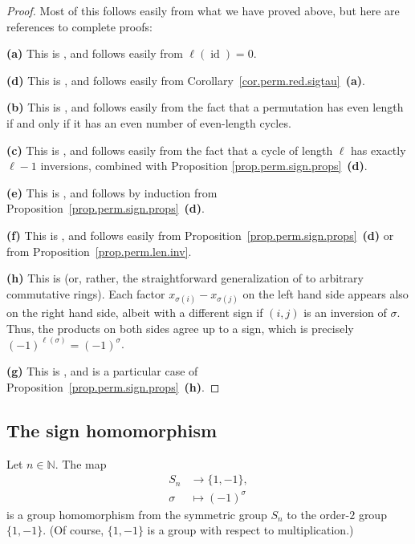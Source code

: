 \begin{proof}
Most of this follows easily from what we have proved above, but here are references to
complete proofs:

\textbf{(a)} This is \cite[Proposition 5.15 \textbf{(a)}]{detnotes}, and
follows easily from $\ell(\operatorname{id}) = 0$.

\textbf{(d)} This is \cite[Proposition 5.15 \textbf{(c)}]{detnotes}, and
follows easily from Corollary~\ref{cor.perm.red.sigtau}~\textbf{(a)}.

\textbf{(b)} This is \cite[Exercise 5.10 \textbf{(b)}]{detnotes}, and follows
easily from the fact that a permutation has even length if and only if
it has an even number of even-length cycles.

\textbf{(c)} This is \cite[Exercise 5.17 \textbf{(d)}]{detnotes}, and follows
easily from the fact that a cycle of length $\ell$ has exactly $\ell - 1$
inversions, combined with Proposition
\ref{prop.perm.sign.props}~\textbf{(d)}.

\textbf{(e)} This is \cite[Proposition 5.28]{detnotes}, and follows by
induction from Proposition~\ref{prop.perm.sign.props}~\textbf{(d)}.

\textbf{(f)} This is \cite[Proposition 5.15 \textbf{(d)}]{detnotes}, and
follows easily from Proposition~\ref{prop.perm.sign.props}~\textbf{(d)} or
from Proposition~\ref{prop.perm.len.inv}.

\textbf{(h)} This is \cite[Exercise 5.13 \textbf{(a)}]{detnotes} (or, rather,
the straightforward generalization of \cite[Exercise 5.13 \textbf{(a)}]{detnotes}
to arbitrary commutative rings). Each
factor $x_{\sigma(i)} - x_{\sigma(j)}$ on the left
hand side appears also on the right hand side, albeit with a different sign if
$(i,j)$ is an inversion of $\sigma$. Thus, the products on both
sides agree up to a sign, which is precisely $(-1)^{\ell(\sigma)} = (-1)^{\sigma}$.

\textbf{(g)} This is \cite[Exercise 5.13 \textbf{(c)}]{detnotes}, and is a
particular case of Proposition~\ref{prop.perm.sign.props}~\textbf{(h)}.
\end{proof}

\subsection{The sign homomorphism}

\begin{corollary}
\label{cor.perm.sign.hom}
\leantarget
\leanok
Let $n \in \mathbb{N}$. The map
\begin{align*}
S_n &\to \{1, -1\}, \\
\sigma &\mapsto (-1)^{\sigma}
\end{align*}
is a group homomorphism from the symmetric group $S_n$ to the order-$2$
group $\{1, -1\}$. (Of course, $\{1, -1\}$ is a group with respect to
multiplication.)
\end{corollary}

